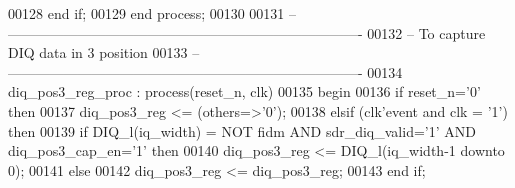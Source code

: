 \begin{DoxyCode}
00128         \textcolor{keywordflow}{end} \textcolor{keywordflow}{if};
00129     \textcolor{keywordflow}{end} \textcolor{keywordflow}{process};
00130 
00131 \textcolor{keyword}{-- ----------------------------------------------------------------------------}
00132 \textcolor{keyword}{-- To capture DIQ data in 3 position}
00133 \textcolor{keyword}{-- ----------------------------------------------------------------------------}
00134 diq\_pos3\_reg\_proc : \textcolor{keywordflow}{process}(reset_n, clk)
00135 \textcolor{vhdlkeyword}{    begin}
00136       \textcolor{keywordflow}{if} \textcolor{vhdlchar}{reset_n}\textcolor{vhdlchar}{=}\textcolor{vhdlchar}{'}\textcolor{vhdllogic}{}\textcolor{vhdllogic}{0}\textcolor{vhdlchar}{'} \textcolor{keywordflow}{then}
00137          \textcolor{vhdlchar}{diq_pos3_reg} \textcolor{vhdlchar}{<=} \textcolor{vhdlchar}{(}\textcolor{keywordflow}{others}\textcolor{vhdlchar}{=}\textcolor{vhdlchar}{>}\textcolor{vhdlchar}{'}\textcolor{vhdllogic}{}\textcolor{vhdllogic}{0}\textcolor{vhdlchar}{'}\textcolor{vhdlchar}{)}; 
00138       \textcolor{keywordflow}{elsif} \textcolor{vhdlchar}{(}\textcolor{vhdlchar}{clk}\textcolor{vhdlchar}{'}\textcolor{vhdlkeyword}{event} \textcolor{keywordflow}{and} \textcolor{vhdlchar}{clk} \textcolor{vhdlchar}{=} \textcolor{vhdlchar}{'}\textcolor{vhdllogic}{}\textcolor{vhdllogic}{1}\textcolor{vhdlchar}{'}\textcolor{vhdlchar}{)} \textcolor{keywordflow}{then}
00139             \textcolor{keywordflow}{if} \textcolor{vhdlchar}{DIQ_l}\textcolor{vhdlchar}{(}\textcolor{vhdlchar}{iq_width}\textcolor{vhdlchar}{)} \textcolor{vhdlchar}{=} \textcolor{keywordflow}{NOT} \textcolor{vhdlchar}{fidm} \textcolor{keywordflow}{AND} \textcolor{vhdlchar}{sdr_diq_valid}\textcolor{vhdlchar}{=}\textcolor{vhdlchar}{'}\textcolor{vhdllogic}{}\textcolor{vhdllogic}{1}\textcolor{vhdlchar}{'} \textcolor{keywordflow}{AND} \textcolor{vhdlchar}{
      diq_pos3_cap_en}\textcolor{vhdlchar}{=}\textcolor{vhdlchar}{'}\textcolor{vhdllogic}{}\textcolor{vhdllogic}{1}\textcolor{vhdlchar}{'} \textcolor{keywordflow}{then} 
00140             \textcolor{vhdlchar}{diq_pos3_reg} \textcolor{vhdlchar}{<=} \textcolor{vhdlchar}{DIQ_l}\textcolor{vhdlchar}{(}\textcolor{vhdlchar}{iq_width}\textcolor{vhdlchar}{-}\textcolor{vhdllogic}{}\textcolor{vhdllogic}{1} \textcolor{keywordflow}{downto} \textcolor{vhdllogic}{}\textcolor{vhdllogic}{0}\textcolor{vhdlchar}{)};
00141             \textcolor{keywordflow}{else} 
00142                 \textcolor{vhdlchar}{diq_pos3_reg} \textcolor{vhdlchar}{<=} \textcolor{vhdlchar}{diq_pos3_reg};
00143             \textcolor{keywordflow}{end} \textcolor{keywordflow}{if}; 

\end{DoxyCode}
